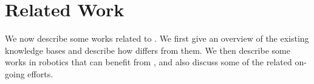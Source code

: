 \section{Related Work\label{sec:relatedwork}}
We now describe some works related to \robobrain{}. We first give an overview of the existing knowledge bases and describe how \robobrain{} differs from them. We then describe some works in robotics that can benefit from \robobrain{}, and also discuss some of the related on-going efforts.

\smallskip



\smallskip



